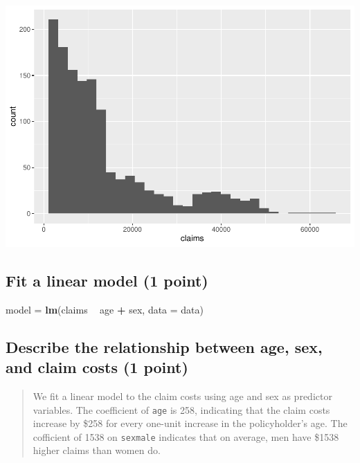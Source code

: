 \documentclass[]{book}
\newenvironment{Shaded}{\begin{snugshade}}{\end{snugshade}}
\newcommand{\DataTypeTok}[1]{\textcolor[rgb]{0.13,0.29,0.53}{#1}}
\newcommand{\KeywordTok}[1]{\textcolor[rgb]{0.13,0.29,0.53}{\textbf{#1}}}
\newcommand{\NormalTok}[1]{#1}
\newcommand{\OperatorTok}[1]{\textcolor[rgb]{0.81,0.36,0.00}{\textbf{#1}}}
\newcommand{\StringTok}[1]{\textcolor[rgb]{0.31,0.60,0.02}{#1}}
\begin{document}
\includegraphics{Exam-PA-Study-Manual_files/figure-latex/unnamed-chunk-139-1.pdf}

\hypertarget{fit-a-linear-model-1-point}{%
\subsection{Fit a linear model (1 point)}\label{fit-a-linear-model-1-point}}

\begin{Shaded}
\begin{Highlighting}[]
\NormalTok{model =}\StringTok{ }\KeywordTok{lm}\NormalTok{(claims }\OperatorTok{~}\StringTok{ }\NormalTok{age }\OperatorTok{+}\StringTok{ }\NormalTok{sex, }\DataTypeTok{data =}\NormalTok{ data)}
\end{Highlighting}
\end{Shaded}

\hypertarget{describe-the-relationship-between-age-sex-and-claim-costs-1-point}{%
\subsection{Describe the relationship between age, sex, and claim costs (1 point)}\label{describe-the-relationship-between-age-sex-and-claim-costs-1-point}}

\begin{quote}
We fit a linear model to the claim costs using age and sex as predictor variables. The coefficient of \texttt{age} is 258, indicating that the claim costs increase by \$258 for every one-unit increase in the policyholder's age. The cofficient of 1538 on \texttt{sexmale} indicates that on average, men have \$1538 higher claims than women do.
\end{quote}
\end{document}
